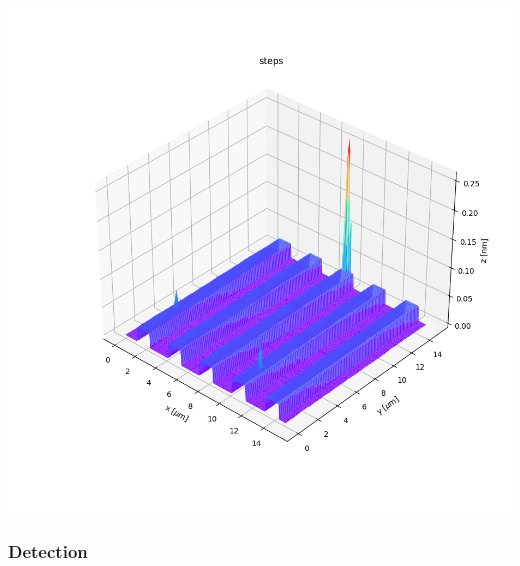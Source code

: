 \documentclass{article}
\begin{document}
\begin{center}
\begin{minipage}{0.3\textwidth}
    \end{minipage}
    \hfill
    \begin{minipage}{0.3\textwidth}
        \includegraphics*[width=\linewidth]{../images/steps_import3.png}
    \end{minipage}
    \label{fig:steps_detection1}
\end{center}

\subsubsection{Detection}\label{subsubsec:Detection}
\end{document}
